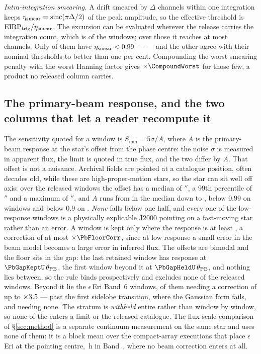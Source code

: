 \emph{Intra-integration smearing.} A drift smeared by $\Delta$ channels within
one integration keeps $\eta_{\rm smear}=\mathrm{sinc}(\pi\Delta/2)$ of the peak
amplitude, so the effective threshold is
$\mathrm{EIRP}_{\rm trig}/\eta_{\rm smear}$. The excursion can be evaluated
wherever the release carries the integration count, which is \CsNDumpWin{} of
the \NWindows{} windows; over those it reaches at most \SmearDeltaMax{}
channels. Only
\NSmearLo{} of them have $\eta_{\rm smear}<0.99$ --- \SmearList{} --- and the
other \NSmearOk{} agree with their nominal thresholds to better than one per
cent. Compounding
the worst smearing penalty with the worst Hanning factor gives
$\times\CompoundWorst$ for those few, a product no released column carries.

\subsection{The primary-beam response, and the two columns that let a reader
recompute it}

The sensitivity quoted for a window is $S_{\min}=5\sigma/A$, where $A$ is the
primary-beam response at the star's offset from the phase centre: the noise
$\sigma$ is measured in apparent flux, the limit is quoted in true flux, and
the two differ by $A$. That offset is not a nuisance. Archival fields are
pointed at a catalogue position, often decades old, while these are
high-proper-motion stars, so the star can sit well off axis: over the
\PbNWin{} released windows the offset has a median of \PbOffMed$''$, a 99th
percentile of \PbOffPNN$''$ and a maximum of \PbOffMax$''$, and $A$ runs from
\PbAMed{} in the median down to \PbAMin, below $0.99$ on \PbNLowNN{} windows
and below $0.9$ on \PbNLowN. \emph{None} falls below one half, and every one
of the low-response windows is a physically explicable J2000 pointing on a
fast-moving star rather than an error. A window is kept only where the
response is at least \PbFloorResp, a correction of at most
$\times\PbFloorCorr$, since at low response a small error in the beam model
becomes a large error in inferred flux. The offsets are bimodal and the floor
sits in the gap: the last retained window has response \PbGapKeptResp{} at
$\PbGapKeptU\,\theta_{\rm PB}$, the first window beyond it \PbGapHeldResp{}
at $\PbGapHeldU\,\theta_{\rm PB}$, and nothing lies between, so the rule
binds prospectively and excludes none of the \NWindows{} released windows.
Beyond it lie the \EpsEriNWin{} $\epsilon$\,Eri Band~6 windows,
\EpsEriNOffAxis{} of them needing a correction of up to
$\times3.5$ --- past the first sidelobe transition, where the
Gaussian form fails, and \EpsEriNOnAxis{} needing none. The stratum is
\emph{withheld} entire rather than window by window, so none of the
\EpsEriNWin{} enters a limit or the released catalogue. The flux-scale comparison of \S\ref{sec:method} is a separate
continuum measurement on the same star and uses none of them: it is a block
mean over the \PxEpsN{} compact-array executions that place $\epsilon$\,Eri
at the pointing centre, \PxEpsHours\,h in Band~\PxEpsBand, where no beam
correction enters at all.

